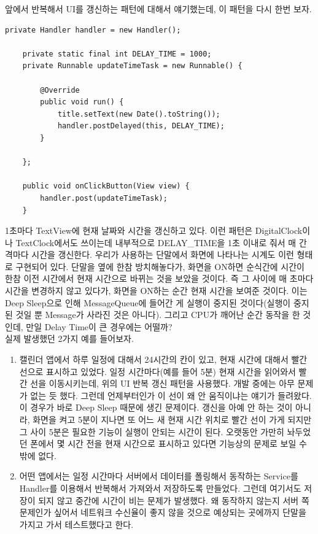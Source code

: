 앞에서 반복해서 UI를 갱신하는 패턴에 대해서 얘기했는데, 이 패턴을 다시 한번 보자.
\begin{lstlisting}[frame=single, caption=Deep Sleep 대응 필요, label=src:DefaultUpdateTime] 
  	private Handler handler = new Handler();

	private static final int DELAY_TIME = 1000;
	private Runnable updateTimeTask = new Runnable() {

		@Override
		public void run() {
			title.setText(new Date().toString());
			handler.postDelayed(this, DELAY_TIME);
		}

	};

	public void onClickButton(View view) {
		handler.post(updateTimeTask);
	}
\end{lstlisting}
1초마다 TextView에 현재 날짜와 시간을 갱신하고 있다.
이런 패턴은 DigitalClock이나 TextClock에서도 쓰이는데 내부적으로 DELAY\_TIME을 1초 이내로 줘서 매 간격마다 시간을 갱신한다. 
우리가 사용하는 단말에서 화면에 나타나는 시계도 이런 형태로 구현되어 있다.
단말을 옆에 한참 방치해놓다가, 화면을 ON하면 순식간에 시간이 한참 이전 시간에서 현재 시간으로 바뀌는 것을 보았을 것이다. 
즉 그 사이에 매 초마다 시간을 변경하지 않고 있다가, 화면을 ON하는 순간 현재 시간을 보여준 것이다.
이는 Deep Sleep으로 인해 MessageQueue에 들어간 게 실행이 중지된 것이다(실행이 중지된 것일 뿐 Message가 사라진 것은 아니다).
그리고 CPU가 깨어난 순간 동작을 한 것인데, 만일 Delay Time이 큰 경우에는 어떨까?\\

실제 발생했던 2가지 예를 들어보자.
\begin{enumerate}
\item 캘린더 앱에서 하루 일정에 대해서 24시간의 칸이 있고, 현재 시간에 대해서 빨간 선으로 표시하고 있었다. 
일정 시간마다(예를 들어 5분) 현재 시간을 읽어와서 빨간 선을 이동시키는데, 위의 UI 반복 갱신 패턴을 사용했다.
개발 중에는 아무 문제가 없는 듯 했다. 그런데 언제부터인가 이 선이 왜 안 움직이냐는 얘기가 들려왔다.
이 경우가 바로 Deep Sleep 때문에 생긴 문제이다. 
갱신을 아예 안 하는 것이 아니라, 화면을 켜고 5분이 지나면 또 어느 새 현재 시간 위치로 빨간 선이 가게 되지만 그 사이 5분은 필요한 기능이 실행이 안되는 시간이 된다.
오랫동안 가만히 놔두었던 폰에서 몇 시간 전을 현재 시간으로 표시하고 있다면 기능상의 문제로 보일 수 밖에 없다.

\item 어떤 앱에서는 일정 시간마다 서버에서 데이터를 폴링해서 동작하는 Service를 Handler를 이용해서 반복해서 가져와서 저장하도록 만들었다. 그런데 여기서도 저장이 되지 않고 중간에 시간이 비는 문제가 발생했다. 왜 동작하지 않는지 서버 쪽 문제인가 싶어서 네트워크 수신율이 좋지 않을 것으로 예상되는 곳에까지 단말을 가지고 가서 테스트했다고 한다.
\end{enumerate}

